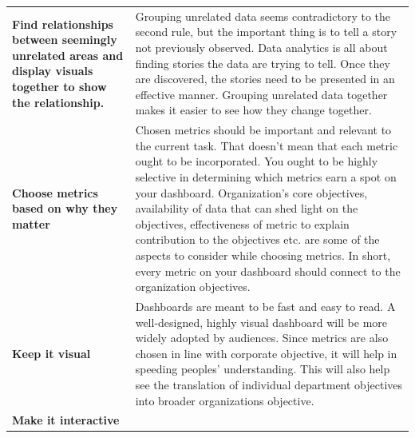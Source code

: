 \documentclass[]{book}
\theoremstyle{definition}
\theoremstyle{definition}
\theoremstyle{definition}
\theoremstyle{remark}
\begin{document}
\begin{longtable}[]{@{}ll@{}}
\begin{minipage}[t]{0.17\columnwidth}
\textbf{Find relationships between seemingly unrelated areas and display
visuals together to show the relationship.}\strut
\end{minipage} & \begin{minipage}[t]{0.72\columnwidth}\raggedright\strut
Grouping unrelated data seems contradictory to the second rule, but the
important thing is to tell a story not previously observed. Data
analytics is all about finding stories the data are trying to tell. Once
they are discovered, the stories need to be presented in an effective
manner. Grouping unrelated data together makes it easier to see how they
change together.\strut
\end{minipage}\tabularnewline
\begin{minipage}[t]{0.17\columnwidth}\raggedright\strut
\textbf{Choose metrics based on why they matter}\strut
\end{minipage} & \begin{minipage}[t]{0.72\columnwidth}\raggedright\strut
Chosen metrics should be important and relevant to the current task.
That doesn't mean that each metric ought to be incorporated. You ought
to be highly selective in determining which metrics earn a spot on your
dashboard. Organization's core objectives, availability of data that can
shed light on the objectives, effectiveness of metric to explain
contribution to the objectives etc. are some of the aspects to consider
while choosing metrics. In short, every metric on your dashboard should
connect to the organization objectives.\strut
\end{minipage}\tabularnewline
\begin{minipage}[t]{0.17\columnwidth}\raggedright\strut
\textbf{Keep it visual}\strut
\end{minipage} & \begin{minipage}[t]{0.72\columnwidth}\raggedright\strut
Dashboards are meant to be fast and easy to read. A well-designed,
highly visual dashboard will be more widely adopted by audiences. Since
metrics are also chosen in line with corporate objective, it will help
in speeding peoples' understanding. This will also help see the
translation of individual department objectives into broader
organizations objective.\strut
\end{minipage}\tabularnewline
\begin{minipage}[t]{0.17\columnwidth}\raggedright\strut
\textbf{Make it interactive}\strut
\end{minipage} & \begin{minipage}[t]{0.72\columnwidth}\raggedright\strut

\end{minipage}
\end{longtable}
\end{document}
